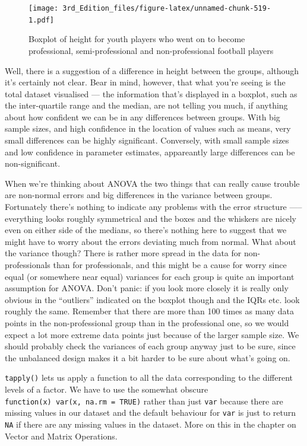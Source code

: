 \documentclass[
]{book}
\begin{document}
\begin{figure}
\centering
\texttt{[image: 3rd\_Edition\_files/figure-latex/unnamed-chunk-519-1.pdf]}
\caption{\label{fig:unnamed-chunk-519}Boxplot of height for youth players who went on to become professional, semi-professional and non-professional football players}
\end{figure}

Well, there is a suggestion of a difference in height between the groups, although it's certainly not clear. Bear in mind, however, that what you're seeing is the total dataset visualised --- the information that's displayed in a boxplot, such as the inter-quartile range and the median, are not telling you much, if anything about how confident we can be in any differences between groups. With big sample sizes, and high confidence in the location of values such as means, very small differences can be highly significant. Conversely, with small sample sizes and low confidence in parameter estimates, appareantly large differences can be non-significant.

When we're thinking about ANOVA the two things that can really cause trouble are non-normal errors and big differences in the variance between groups. Fortunately there's nothing to indicate any problems with the error structure ----- everything looks roughly symmetrical and the boxes and the whiskers are nicely even on either side of the medians, so there's nothing here to suggest that we might have to worry about the errors deviating much from normal. What about the variance though? There is rather more spread in the data for non-professionals than for professionals, and this might be a cause for worry since equal (or somewhere near equal) variances for each group is quite an important assumption for ANOVA. Don't panic: if you look more closely it is really only obvious in the ``outliers'' indicated on the boxplot though and the IQRs etc. look roughly the same. Remember that there are more than 100 times as many data points in the non-professional group than in the professional one, so we would expect a lot more extreme data points just because of the larger sample size. We should probably check the variances of each group anyway just to be sure, since the unbalanced design makes it a bit harder to be sure about what's going on.

\texttt{tapply()} lets us apply a function to all the data corresponding to the different levels of a factor. We have to use the somewhat obscure \texttt{function(x)\ var(x,\ na.rm\ =\ TRUE)} rather than just \texttt{var} because there are missing values in our dataset and the default behaviour for \texttt{var} is just to return \texttt{NA} if there are any missing values in the dataset. More on this in the chapter on Vector and Matrix Operations.
\end{document}
